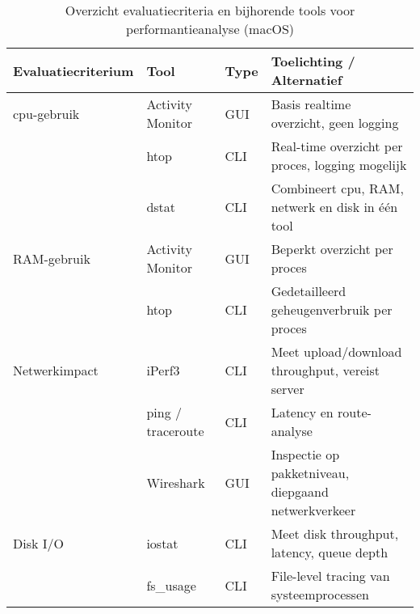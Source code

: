 \begin{table}[h]
    \centering
    \small
    \scriptsize
    \begin{tabular}{
        >{\raggedright\arraybackslash}p{3.5cm} 
        >{\raggedright\arraybackslash}p{4cm} 
        >{\raggedright\arraybackslash}p{2.5cm} 
        >{\raggedright\arraybackslash}p{4cm}
    }
        \toprule
        \textbf{Evaluatiecriterium} & \textbf{Tool} & \textbf{Type} & \textbf{Toelichting / Alternatief} \\ 
        \midrule
        \gls{cpu}-gebruik & Activity Monitor & GUI & Basis realtime overzicht, geen logging \\
                    & htop & CLI & Real-time overzicht per proces, logging mogelijk \\
                    & dstat & CLI & Combineert \gls{cpu}, RAM, netwerk en disk in één tool \\
        \midrule
        RAM-gebruik & Activity Monitor & GUI & Beperkt overzicht per proces \\
                    & htop & CLI & Gedetailleerd geheugenverbruik per proces \\
        \midrule
        Netwerkimpact & iPerf3 & CLI & Meet upload/download throughput, vereist server \\
                      & ping / traceroute & CLI & Latency en route-analyse \\
                      & Wireshark & GUI & Inspectie op pakketniveau, diepgaand netwerkverkeer \\
        \midrule
        Disk I/O & iostat & CLI & Meet disk throughput, latency, queue depth \\
                 & fs\_usage & CLI & File-level tracing van systeemprocessen \\
        \bottomrule
    \end{tabular}
    \caption{Overzicht evaluatiecriteria en bijhorende tools voor performantieanalyse (macOS)}
    \label{tab:eval-criteria-performance}
\end{table}